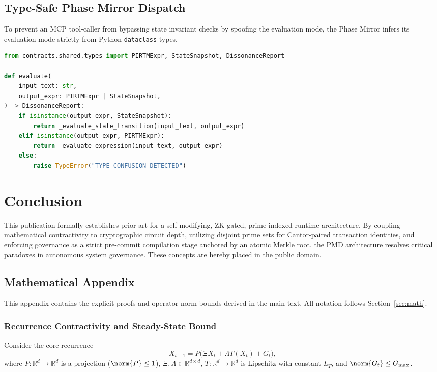 \documentclass[11pt]{article}
\begin{document}
\section{Type-Safe Phase Mirror Dispatch}
To prevent an MCP tool-caller from bypassing state invariant checks by spoofing the evaluation mode, the Phase Mirror infers its evaluation mode strictly from Python \texttt{dataclass} types.

\begin{lstlisting}[language=Python]
from contracts.shared.types import PIRTMExpr, StateSnapshot, DissonanceReport

def evaluate(
    input_text: str,
    output_expr: PIRTMExpr | StateSnapshot, 
) -> DissonanceReport:
    if isinstance(output_expr, StateSnapshot):
        return _evaluate_state_transition(input_text, output_expr)
    elif isinstance(output_expr, PIRTMExpr):
        return _evaluate_expression(input_text, output_expr)
    else:
        raise TypeError("TYPE_CONFUSION_DETECTED")
\end{lstlisting}

\chapter{Conclusion}
This publication formally establishes prior art for a self-modifying, ZK-gated, prime-indexed runtime architecture. By coupling mathematical contractivity to cryptographic circuit depth, utilizing disjoint prime sets for Cantor-paired transaction identities, and enforcing governance as a strict pre-commit compilation stage anchored by an atomic Merkle root, the PMD architecture resolves critical paradoxes in autonomous system governance. These concepts are hereby placed in the public domain.
\section{Mathematical Appendix}
\label{app:math}

This appendix contains the explicit proofs and operator norm bounds derived in the main text.
All notation follows Section~\ref{sec:math}.

\subsection{Recurrence Contractivity and Steady-State Bound}
\label{app:recurrence}

Consider the core recurrence
\begin{equation}
    X_{t+1} = P\bigl(\Xi X_t + \Lambda T(X_t) + G_t\bigr),
\end{equation}
where $P:\mathbb{R}^d\to\mathbb{R}^d$ is a projection ($\norm{P}\le 1$), $\Xi,\Lambda\in\mathbb{R}^{d\times d}$,
$T:\mathbb{R}^d\to\mathbb{R}^d$ is Lipschitz with constant $L_T$, and $\norm{G_t}\le G_{\max}$.
\end{document}
